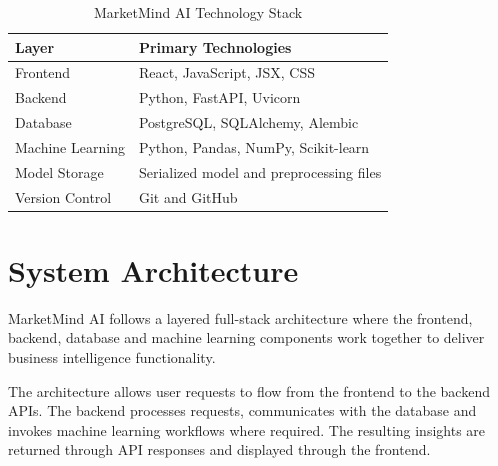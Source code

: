 \documentclass[12pt,a4paper]{report}
\begin{document}
\begin{table}[H]

\centering

\caption{MarketMind AI Technology Stack}

\begin{tabular}{p{4cm} p{9cm}}

\toprule

\textbf{Layer} &
\textbf{Primary Technologies}

\\

\midrule

Frontend &
React, JavaScript, JSX, CSS

\\[6pt]

Backend &
Python, FastAPI, Uvicorn

\\[6pt]

Database &
PostgreSQL, SQLAlchemy, Alembic

\\[6pt]

Machine Learning &
Python, Pandas, NumPy, Scikit-learn

\\[6pt]

Model Storage &
Serialized model and preprocessing files

\\[6pt]

Version Control &
Git and GitHub

\\

\bottomrule

\end{tabular}

\end{table}



\chapter{System Architecture}

MarketMind AI follows a layered full-stack architecture where the
frontend, backend, database and machine learning components work
together to deliver business intelligence functionality.

The architecture allows user requests to flow from the frontend to the
backend APIs. The backend processes requests, communicates with the
database and invokes machine learning workflows where required. The
resulting insights are returned through API responses and displayed
through the frontend.
\end{document}
